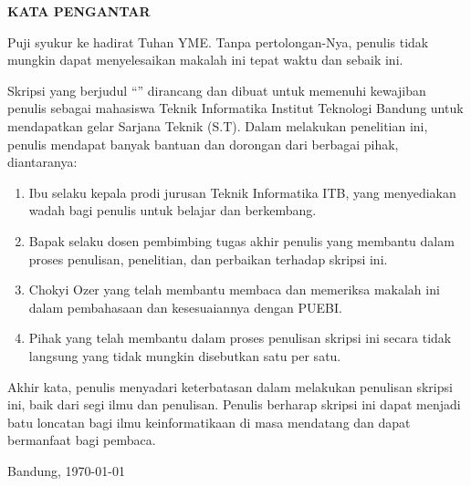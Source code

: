 \clearpage

\begin{center}
 \textbf{\large KATA PENGANTAR}\\[3em]
\end{center}

Puji syukur ke hadirat Tuhan YME.\@
Tanpa pertolongan-Nya, penulis tidak mungkin dapat menyelesaikan makalah ini tepat waktu dan sebaik ini.

Skripsi yang berjudul ``\textit{\thetitle}'' dirancang dan dibuat untuk memenuhi kewajiban penulis sebagai mahasiswa Teknik Informatika Institut Teknologi Bandung untuk mendapatkan gelar Sarjana Teknik (S.T).
Dalam melakukan penelitian ini, penulis mendapat banyak bantuan dan dorongan dari berbagai pihak, diantaranya:
\begin{enumerate}
  \item Ibu \dean{} selaku kepala prodi jurusan Teknik Informatika ITB, yang menyediakan wadah bagi penulis untuk belajar dan berkembang.
  \item Bapak \supervisor{} selaku dosen pembimbing tugas akhir penulis yang membantu dalam proses penulisan, penelitian, dan perbaikan terhadap skripsi ini.
  \item Chokyi Ozer yang telah membantu membaca dan memeriksa makalah ini dalam pembahasaan dan kesesuaiannya dengan PUEBI.\@ 
  \item Pihak yang telah membantu dalam proses penulisan skripsi ini secara tidak langsung yang tidak mungkin disebutkan satu per satu. 
\end{enumerate}

Akhir kata, penulis menyadari keterbatasan dalam melakukan penulisan skripsi ini, baik dari segi ilmu dan penulisan.
Penulis berharap skripsi ini dapat menjadi batu loncatan bagi ilmu keinformatikaan di masa mendatang dan dapat bermanfaat bagi pembaca.

Bandung, \today

\theauthor{}


